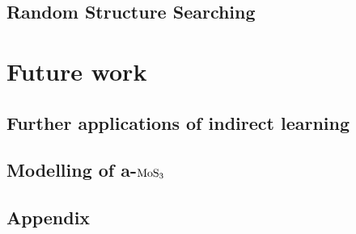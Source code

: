 \documentclass[12pt,a4paper,twoside,nobind]{ociamthesis}
\begin{document}
\section{Random Structure Searching}

%
%
\chapter{Future work}

\section{Further applications of indirect learning}

\section{Modelling of a-$\ce{MoS3}$}

\clearpage
\section*{Appendix}

%
\printbibliography
%
\end{document}
